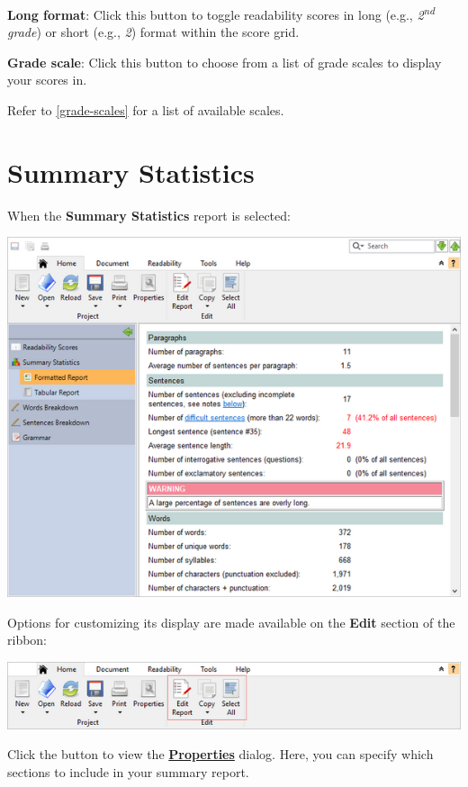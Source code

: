 \documentclass[
]{book}
\theoremstyle{definition}
\theoremstyle{definition}
\theoremstyle{definition}
\theoremstyle{definition}
\theoremstyle{remark}
\begin{document}
\textbf{Long format}: Click this button to toggle readability scores in long (e.g., \emph{2\textsuperscript{nd} grade}) or short (e.g., \emph{2}) format within the score grid.

\textbf{Grade scale}: Click this button to choose from a list of grade scales to display your scores in.

Refer to \ref{grade-scales} for a list of available scales.

\hypertarget{summary-statistics}{%
\section{Summary Statistics}\label{summary-statistics}}

When the \textbf{Summary Statistics} report is selected:

\includegraphics{Images/featuresstats.png}

Options for customizing its display are made available on the \textbf{Edit} section of the ribbon:

\includegraphics{Images/RibbonEditStats.png}

Click the  button to view the \protect\hyperlink{options-statistics}{\textbf{Properties}} dialog. Here, you can specify which sections to include in your summary report.
\end{document}
